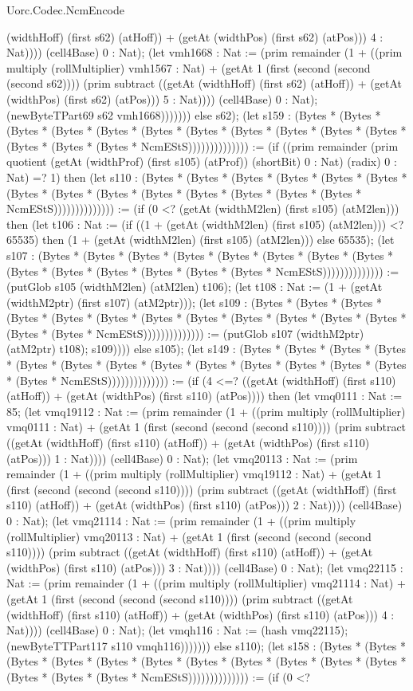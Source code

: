 \begin{lexlean}{Uorc.Codec.NcmEncode}
\begin{semanticmodule}
{(widthHoff) (first s62) (atHoff)) + (getAt (widthPos) (first s62) (atPos))) 4 : Nat)))) (cell4Base) 0 : Nat); (let vmh1668 : Nat := (prim remainder (1 + ((prim multiply (rollMultiplier) vmh1567 : Nat) + (getAt 1 (first (second (second (second s62)))) (prim subtract ((getAt (widthHoff) (first s62) (atHoff)) + (getAt (widthPos) (first s62) (atPos))) 5 : Nat)))) (cell4Base) 0 : Nat); (newByteTPart69 s62 vmh1668))))))) else s62); (let s159 : (Bytes * (Bytes * (Bytes * (Bytes * (Bytes * (Bytes * (Bytes * (Bytes * (Bytes * (Bytes * (Bytes * (Bytes * (Bytes * (Bytes * NcmEStS)))))))))))))) := (if ((prim remainder (prim quotient (getAt (widthProf) (first s105) (atProf)) (shortBit) 0 : Nat) (radix) 0 : Nat) =? 1) then (let s110 : (Bytes * (Bytes * (Bytes * (Bytes * (Bytes * (Bytes * (Bytes * (Bytes * (Bytes * (Bytes * (Bytes * (Bytes * (Bytes * (Bytes * NcmEStS)))))))))))))) := (if (0 <? (getAt (widthM2len) (first s105) (atM2len))) then (let t106 : Nat := (if ((1 + (getAt (widthM2len) (first s105) (atM2len))) <? 65535) then (1 + (getAt (widthM2len) (first s105) (atM2len))) else 65535); (let s107 : (Bytes * (Bytes * (Bytes * (Bytes * (Bytes * (Bytes * (Bytes * (Bytes * (Bytes * (Bytes * (Bytes * (Bytes * (Bytes * (Bytes * NcmEStS)))))))))))))) := (putGlob s105 (widthM2len) (atM2len) t106); (let t108 : Nat := (1 + (getAt (widthM2ptr) (first s107) (atM2ptr))); (let s109 : (Bytes * (Bytes * (Bytes * (Bytes * (Bytes * (Bytes * (Bytes * (Bytes * (Bytes * (Bytes * (Bytes * (Bytes * (Bytes * (Bytes * NcmEStS)))))))))))))) := (putGlob s107 (widthM2ptr) (atM2ptr) t108); s109)))) else s105); (let s149 : (Bytes * (Bytes * (Bytes * (Bytes * (Bytes * (Bytes * (Bytes * (Bytes * (Bytes * (Bytes * (Bytes * (Bytes * (Bytes * (Bytes * NcmEStS)))))))))))))) := (if (4 <=? ((getAt (widthHoff) (first s110) (atHoff)) + (getAt (widthPos) (first s110) (atPos)))) then (let vmq0111 : Nat := 85; (let vmq19112 : Nat := (prim remainder (1 + ((prim multiply (rollMultiplier) vmq0111 : Nat) + (getAt 1 (first (second (second (second s110)))) (prim subtract ((getAt (widthHoff) (first s110) (atHoff)) + (getAt (widthPos) (first s110) (atPos))) 1 : Nat)))) (cell4Base) 0 : Nat); (let vmq20113 : Nat := (prim remainder (1 + ((prim multiply (rollMultiplier) vmq19112 : Nat) + (getAt 1 (first (second (second (second s110)))) (prim subtract ((getAt (widthHoff) (first s110) (atHoff)) + (getAt (widthPos) (first s110) (atPos))) 2 : Nat)))) (cell4Base) 0 : Nat); (let vmq21114 : Nat := (prim remainder (1 + ((prim multiply (rollMultiplier) vmq20113 : Nat) + (getAt 1 (first (second (second (second s110)))) (prim subtract ((getAt (widthHoff) (first s110) (atHoff)) + (getAt (widthPos) (first s110) (atPos))) 3 : Nat)))) (cell4Base) 0 : Nat); (let vmq22115 : Nat := (prim remainder (1 + ((prim multiply (rollMultiplier) vmq21114 : Nat) + (getAt 1 (first (second (second (second s110)))) (prim subtract ((getAt (widthHoff) (first s110) (atHoff)) + (getAt (widthPos) (first s110) (atPos))) 4 : Nat)))) (cell4Base) 0 : Nat); (let vmqh116 : Nat := (hash vmq22115); (newByteTTPart117 s110 vmqh116))))))) else s110); (let s158 : (Bytes * (Bytes * (Bytes * (Bytes * (Bytes * (Bytes * (Bytes * (Bytes * (Bytes * (Bytes * (Bytes * (Bytes * (Bytes * (Bytes * NcmEStS)))))))))))))) := (if (0 <? }
\end{semanticmodule}
\end{lexlean}
